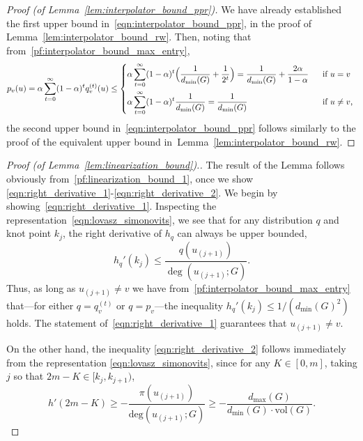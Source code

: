 \documentclass{article}
\newcommand{\vol}{\mathrm{vol}}
\newcommand{\1}{\mathbf{1}}
\theoremstyle{definition}
\theoremstyle{remark}
\begin{document}
\begin{proof}[Proof (of Lemma~\ref{lem:interpolator_bound_ppr})]
	We have already established the first upper bound in~\eqref{eqn:interpolator_bound_ppr}, in the proof of Lemma~\ref{lem:interpolator_bound_rw}. Then, noting that from~\eqref{pf:interpolator_bound_max_entry}, 
	\begin{equation}
	\label{eqn:ppr_max_entry}
	p_v(u) = \alpha \sum_{t = 0}^{\infty} (1 - \alpha)^t q_v^{(t)}(u) \leq
	\begin{dcases*}
	\alpha \sum_{t = 0}^{\infty} (1 - \alpha)^t \Bigl(\frac{1}{d_{\min}(G)} + \frac{1}{2^t}\Bigr) = \frac{1}{d_{\min}(G)} + \frac{2\alpha}{1 - \alpha}& ~~\textrm{if $u = v$} \\
	\alpha \sum_{t = 0}^{\infty} (1 - \alpha)^t \frac{1}{d_{\min}(G)} = \frac{1}{d_{\min}(G)} & ~~\textrm{if $u \neq v$,}
	\end{dcases*}
	\end{equation}
	the second upper bound in~\eqref{eqn:interpolator_bound_ppr} follows similarly to the proof of the equivalent upper bound in~Lemma~\ref{lem:interpolator_bound_rw}.
\end{proof}

\begin{proof}[Proof (of Lemma~\ref{lem:linearization_bound}).]
	The result of the Lemma follows obviously from~\eqref{pf:linearization_bound_1}, once we show \eqref{eqn:right_derivative_1}-\eqref{eqn:right_derivative_2}. We begin by showing~\eqref{eqn:right_derivative_1}. Inspecting the representation~\eqref{eqn:lovasz_simonovits}, we see that for any distribution $q$ and knot point $k_j$, the right derivative of $h_q$ can always be upper bounded,
	\begin{equation*}
	h_{q}'(k_j) \leq \frac{q(u_{(j + 1)})}{\deg(u_{(j + 1)};G)}.
	\end{equation*}
	Thus, as long as $u_{(j + 1)} \neq v$ we have from~\eqref{pf:interpolator_bound_max_entry} that---for either $q = q_v^{(t)}$ or $q = p_v$---the inequality $h_{q}'(k_j) \leq 1/(d_{\min}(G)^2)$ holds. The statement of~\eqref{eqn:right_derivative_1} guarantees that $u_{(j + 1)} \neq v$. 
	
	On the other hand, the inequality \eqref{eqn:right_derivative_2} follows immediately from the representation \eqref{eqn:lovasz_simonovits}, since for any $K \in [0,m]$, taking $j$ so that $2m - K \in [k_j, k_{j + 1})$, 
	\begin{equation*}
	h'(2m - K) \geq -\frac{\pi(u_{(j+1)})}{\mathrm{deg}(u_{(j + 1)};G)} \geq -\frac{d_{\max}(G)}{d_{\min}(G) \cdot \vol(G)}.
	\end{equation*}
\end{proof}
\end{document}
